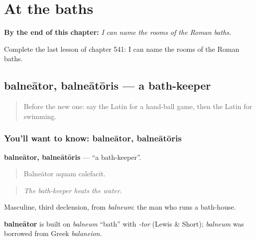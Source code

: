 
\chapter{At the baths}
\label{ch:la-at-the-baths}

\begin{chapteropening}
\textbf{By the end of this chapter:} \emph{I can name the rooms of the Roman baths.}

Complete the last lesson of chapter 541: I can name the rooms of the Roman baths.
\end{chapteropening}

\section[balneātor, balneātōris]{balneātor, balneātōris — a bath-keeper}

\label{lesson:LA-C541-balneator}



\begin{quote}
Before the new one: say the Latin for a hand-ball game, then the Latin for swimming.
\end{quote}

\subsection*{You'll want to know: balneātor, balneātōris}
\textbf{balneātor, balneātōris} — \textquotedblleft{}a bath-keeper\textquotedblright{}.

\begin{quote}
Balneātor aquam calefacit.
\end{quote}

\begin{quote}
\emph{The bath-keeper heats the water.}
\end{quote}

Masculine, third declension, from \emph{balneum}: the man who runs a bath-house.

\begin{cousinweb}
\textbf{balneātor} is built on \emph{balneum} \textquotedblleft{}bath\textquotedblright{} with \emph{-tor} (Lewis \& Short); \emph{balneum} was borrowed from Greek \emph{balaneion}.
\end{cousinweb}

